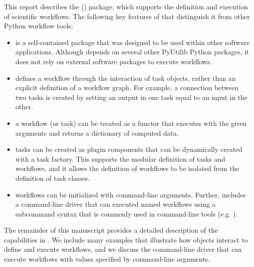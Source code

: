 This report describes the  (\pw) package, which supports the definition and
execution of scientific workflows.  The following key features of \pwsp that distinguish it from 
other Python workflow tools:
\begin{itemize}

\item \pwsp is a self-contained package that was designed to be used
within other software applications.  Although \pwsp depends on several
other PyUtilib Python packages, it does not rely on external software
packages to execute \pwsp workflows.

\item \pwsp defines a workflow through the interaction of task objects,
rather than an explicit definition of a workflow graph.  For example,
a connection between two tasks is created by setting an output in one
task equal to an input in the other.

\item a \pwsp workflow (or task) can be treated as a functor that executes
with the given arguments and returns a dictionary of computed data.

\item \pwsp tasks can be created as plugin components that can be
dynamically created with a task factory.  This supports the modular
definition of tasks and workflows, and it allows the definition of
workflows to be isolated from the definition of task classes.

\item \pwsp workflows can be initialized with command-line arguments.  Further, \pwsp includes
a command-line driver that can executed named workflows using a subcommand syntax that is commonly
used in command-line tools (e.g. ).
\end{itemize}

The remainder of this manuscript provides a detailed description of the
capabilities in \pw.  We include many examples that illustrate how \pwsp
objects interact to define and execute workflows, and we discuss the command-line driver that can
execute workflows with values specified by command-line arguments.

